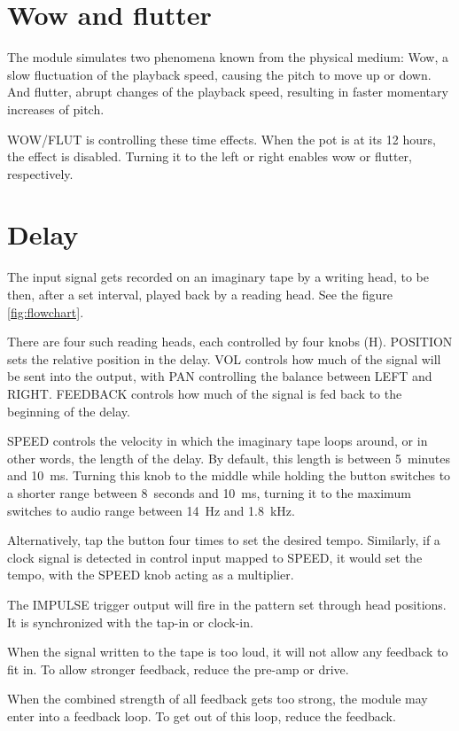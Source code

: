 \documentclass[11pt]{article}
\begin{document}
\begin{minipage}{0.05\textwidth}
\phantom{ }
\end{minipage}%
\begin{minipage}[t]{0.45\textwidth}
\setlength{\parskip}{6pt}

\section{Wow and flutter}

The module simulates two phenomena known from the physical medium:
Wow, a slow fluctuation of the playback speed, causing the pitch to move up or
down.
And flutter, abrupt changes of the playback speed, resulting in faster momentary
increases of pitch.

WOW/FLUT is controlling these time effects. When the pot is at its 12 hours, the
effect is disabled. Turning it to the left or right enables wow or flutter,
respectively.

\section{Delay}

The input signal gets recorded on an imaginary tape by a writing head, to be
then, after a set interval, played back by a reading head. See the figure 
\ref{fig:flowchart}.

There are four such reading heads, each controlled by four knobs (H). POSITION
sets the relative position in the delay. VOL controls how much of the signal
will be sent into the output, with PAN controlling the balance between LEFT and
RIGHT. FEEDBACK controls how much of the signal is fed back to the beginning of
the delay.

SPEED controls the velocity in which the imaginary tape loops around, or in
other words, the length of the delay. By default, this length is between
5~minutes and 10~ms. Turning this knob to the middle while holding the button
switches to a shorter range between 8~seconds and 10~ms, turning it to the
maximum switches to audio range between 14~Hz and 1.8~kHz.

Alternatively, tap the button four times to set the desired tempo.
Similarly, if a clock signal is detected in control input mapped to SPEED, it
would set the tempo, with the SPEED knob acting as a multiplier.

The IMPULSE trigger output will fire in the pattern set through head positions.
It is synchronized with the tap-in or clock-in.

When the signal written to the tape is too loud, it will not allow any feedback
to fit in. To allow stronger feedback, reduce the pre-amp or drive.

When the combined strength of all feedback gets too strong, the module may enter
into a feedback loop. To get out of this loop, reduce the feedback.

\end{minipage}
\end{document}
